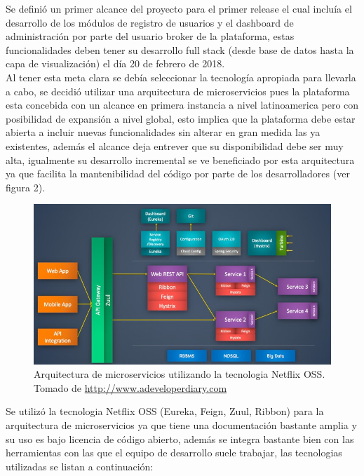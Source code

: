Se definió un primer alcance del proyecto para el primer release el cual incluía el desarrollo de los módulos de registro de usuarios y el dashboard de administración por parte del usuario broker de la plataforma, estas funcionalidades deben tener su desarrollo full stack (desde base de datos hasta la capa de visualización) el día 20 de febrero de 2018. \\

Al tener esta meta clara se debía seleccionar la tecnología apropiada para llevarla a cabo, se decidió utilizar una arquitectura de microservicios pues la plataforma esta concebida con un alcance en primera instancia a nivel latinoamerica pero con posibilidad de expansión a nivel global, esto implica que la plataforma debe estar abierta a incluir nuevas funcionalidades sin alterar en gran medida las ya existentes, además el alcance deja entrever que su disponibilidad debe ser muy alta, igualmente su desarrollo incremental se ve beneficiado por esta arquitectura ya que facilita la mantenibilidad del código por parte de los desarrolladores (ver figura 2).

\begin{figure}[ht]
  \includegraphics[scale=0.6, center]{images/netflix_microservices.jpg}
  \caption{Arquitectura de microservicios utilizando la tecnologia Netflix OSS. Tomado de \url{http://www.adeveloperdiary.com}}
  \label{fig:img3}
\end{figure}

Se utilizó la tecnologia Netflix OSS (Eureka, Feign, Zuul, Ribbon) para la arquitectura de microservicios ya que tiene una documentación bastante amplia y su uso es bajo licencia de código abierto, además se integra bastante bien con las herramientas con las que el equipo de desarrollo suele trabajar, las tecnologias utilizadas se listan a continuación:

